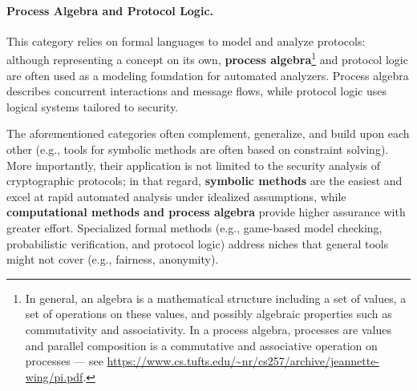 \paragraph*{Process Algebra and Protocol Logic.} This category relies on formal languages to model and analyze protocols: although representing a concept on its own, \textbf{process algebra}\footnote{In general, an algebra is a mathematical structure including a set of values, a set of operations on these values, and possibly algebraic properties such as commutativity and associativity. In a process algebra, processes are values and parallel composition is a commutative and associative operation on processes --- see \url{https://www.cs.tufts.edu/~nr/cs257/archive/jeannette-wing/pi.pdf}.} and protocol logic are often used as a modeling foundation for automated analyzers. Process algebra describes concurrent interactions and message flows, while protocol logic uses logical systems tailored to security.



The aforementioned categories often complement, generalize, and build upon each other (e.g., tools for symbolic methods are often based on constraint solving). More importantly, their application is not limited to the security analysis of cryptographic protocols; in that regard, \textbf{symbolic methods} are the easiest and excel at rapid automated analysis under idealized assumptions, while \textbf{computational methods and process algebra} provide higher assurance with greater effort. Specialized formal methods (e.g., game-based model checking, probabilistic verification, and protocol logic) address niches that general tools might not cover (e.g., fairness, anonymity). 


